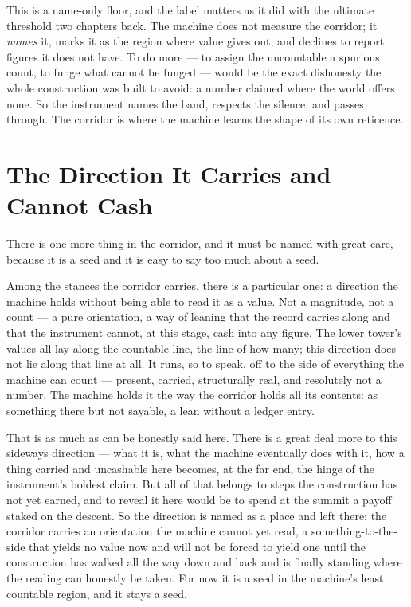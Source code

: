 This is a name-only floor, and the label matters as it did with the ultimate threshold two chapters back. The
machine does not measure the corridor; it \emph{names} it, marks it as the region where value gives out, and
declines to report figures it does not have. To do more --- to assign the uncountable a spurious count, to funge
what cannot be funged --- would be the exact dishonesty the whole construction was built to avoid: a number
claimed where the world offers none. So the instrument names the band, respects the silence, and passes through.
The corridor is where the machine learns the shape of its own reticence.

\section{The Direction It Carries and Cannot Cash}

There is one more thing in the corridor, and it must be named with great care, because it is a seed and it is
easy to say too much about a seed.

Among the stances the corridor carries, there is a particular one: a direction the machine holds without being
able to read it as a value. Not a magnitude, not a count --- a pure orientation, a way of leaning that the record
carries along and that the instrument cannot, at this stage, cash into any figure. The lower tower's values all
lay along the countable line, the line of how-many; this direction does not lie along that line at all. It runs,
so to speak, off to the side of everything the machine can count --- present, carried, structurally real, and
resolutely not a number. The machine holds it the way the corridor holds all its contents: as something there but
not sayable, a lean without a ledger entry.

That is as much as can be honestly said here. There is a great deal more to this sideways direction --- what it
is, what the machine eventually does with it, how a thing carried and uncashable here becomes, at the far end, the
hinge of the instrument's boldest claim. But all of that belongs to steps the construction has not yet earned,
and to reveal it here would be to spend at the summit a payoff staked on the descent. So the direction is named
as a place and left there: the corridor carries an orientation the machine cannot yet read, a
something-to-the-side that yields no value now and will not be forced to yield one until the construction has
walked all the way down and back and is finally standing where the reading can honestly be taken. For now it is a
seed in the machine's least countable region, and it stays a seed.

